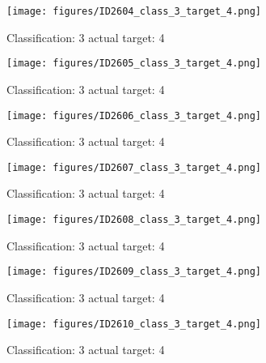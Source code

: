 \begin{figure}[h!]
\begin{center}
\texttt{[image: figures/ID2604\_class\_3\_target\_4.png]}
\end{center}
\caption{ Classification: 3 actual target: 4}
\label{fig:ID2604_class_3_target_4}
\end{figure}
\begin{figure}[h!]
\begin{center}
\texttt{[image: figures/ID2605\_class\_3\_target\_4.png]}
\end{center}
\caption{ Classification: 3 actual target: 4}
\label{fig:ID2605_class_3_target_4}
\end{figure}
\begin{figure}[h!]
\begin{center}
\texttt{[image: figures/ID2606\_class\_3\_target\_4.png]}
\end{center}
\caption{ Classification: 3 actual target: 4}
\label{fig:ID2606_class_3_target_4}
\end{figure}
\begin{figure}[h!]
\begin{center}
\texttt{[image: figures/ID2607\_class\_3\_target\_4.png]}
\end{center}
\caption{ Classification: 3 actual target: 4}
\label{fig:ID2607_class_3_target_4}
\end{figure}
\begin{figure}[h!]
\begin{center}
\texttt{[image: figures/ID2608\_class\_3\_target\_4.png]}
\end{center}
\caption{ Classification: 3 actual target: 4}
\label{fig:ID2608_class_3_target_4}
\end{figure}
\begin{figure}[h!]
\begin{center}
\texttt{[image: figures/ID2609\_class\_3\_target\_4.png]}
\end{center}
\caption{ Classification: 3 actual target: 4}
\label{fig:ID2609_class_3_target_4}
\end{figure}
\begin{figure}[h!]
\begin{center}
\texttt{[image: figures/ID2610\_class\_3\_target\_4.png]}
\end{center}
\caption{ Classification: 3 actual target: 4}
\label{fig:ID2610_class_3_target_4}
\end{figure}
